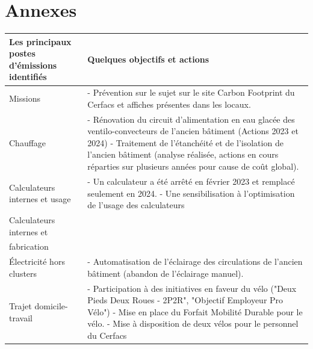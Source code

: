 \section*{Annexes}





\begin{table}[H]
    \centering
    \begin{tabular}{|p{}|p{}|}
    \hline
    \textbf{Les principaux postes d’émissions identifiés} & \textbf{Quelques objectifs et actions} \\
    \hline
    Missions & 
    - Prévention sur le sujet sur le site Carbon Footprint du Cerfacs et affiches présentes dans les locaux. \\
    \hline
    Chauffage & 
    - Rénovation du circuit d’alimentation en eau glacée des ventilo-convecteurs de l’ancien bâtiment (Actions 2023 et 2024) \newline
    - Traitement de l’étanchéité et de l’isolation de l’ancien bâtiment (analyse réalisée, actions en cours réparties sur plusieurs années pour cause de coût global). \\
    \hline
    Calculateurs internes et usage & 
    - Un calculateur a été arrêté en février 2023 et remplacé seulement en 2024. \newline
    - Une sensibilisation à l’optimisation de l’usage des calculateurs \\
    \hline
    Calculateurs internes et \\fabrication & 
    \phantom{-}
    \phantom{-}\\
    \hline
    Électricité hors clusters & 
    - Automatisation de l’éclairage des circulations de l’ancien bâtiment (abandon de l’éclairage manuel). \\
    \hline
    Trajet domicile-travail & 
    - Participation à des initiatives en faveur du vélo ("Deux Pieds Deux Roues - 2P2R", "Objectif Employeur Pro Vélo") \newline
    - Mise en place du Forfait Mobilité Durable pour le vélo. \newline
    - Mise à disposition de deux vélos pour le personnel du Cerfacs \\

\end{tabular}
\end{table}
